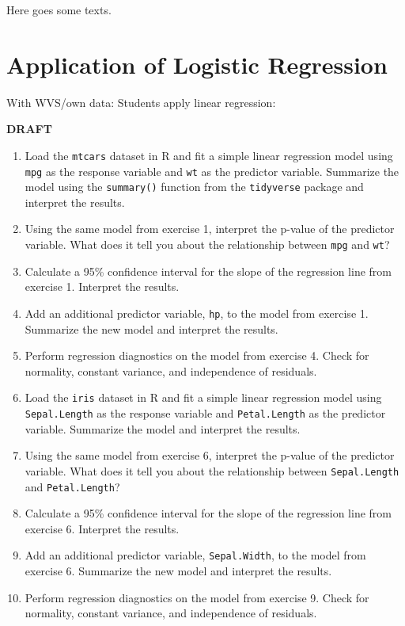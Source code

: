 \documentclass[
]{book}
\begin{document}
Here goes some texts.

\hypertarget{application-of-logistic-regression}{%
\section{Application of Logistic Regression}\label{application-of-logistic-regression}}

With WVS/own data: Students apply linear regression:

\textbf{DRAFT}

\begin{enumerate}
\def\labelenumi{\arabic{enumi}.}
\item
  Load the \texttt{mtcars} dataset in R and fit a simple linear regression model using \texttt{mpg} as the response variable and \texttt{wt} as the predictor variable. Summarize the model using the \texttt{summary()} function from the \texttt{tidyverse} package and interpret the results.
\item
  Using the same model from exercise 1, interpret the p-value of the predictor variable. What does it tell you about the relationship between \texttt{mpg} and \texttt{wt}?
\item
  Calculate a 95\% confidence interval for the slope of the regression line from exercise 1. Interpret the results.
\item
  Add an additional predictor variable, \texttt{hp}, to the model from exercise 1. Summarize the new model and interpret the results.
\item
  Perform regression diagnostics on the model from exercise 4. Check for normality, constant variance, and independence of residuals.
\item
  Load the \texttt{iris} dataset in R and fit a simple linear regression model using \texttt{Sepal.Length} as the response variable and \texttt{Petal.Length} as the predictor variable. Summarize the model and interpret the results.
\item
  Using the same model from exercise 6, interpret the p-value of the predictor variable. What does it tell you about the relationship between \texttt{Sepal.Length} and \texttt{Petal.Length}?
\item
  Calculate a 95\% confidence interval for the slope of the regression line from exercise 6. Interpret the results.
\item
  Add an additional predictor variable, \texttt{Sepal.Width}, to the model from exercise 6. Summarize the new model and interpret the results.
\item
  Perform regression diagnostics on the model from exercise 9. Check for normality, constant variance, and independence of residuals.
\end{enumerate}
\end{document}

